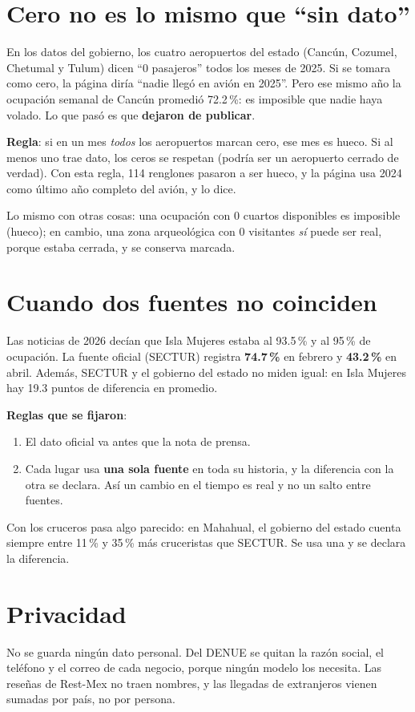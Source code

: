 \section{Cero no es lo mismo que ``sin dato''}
\begin{ejemplo}
En los datos del gobierno, los cuatro aeropuertos del estado (Cancún, Cozumel, Chetumal y Tulum) dicen ``0 pasajeros''
todos los meses de 2025. Si se tomara como cero, la página diría ``nadie llegó en avión en 2025''. Pero ese mismo año la
ocupación semanal de Cancún promedió 72.2\,\%: es imposible que nadie haya volado. Lo que pasó es que \textbf{dejaron de
publicar}.

\textbf{Regla}: si en un mes \emph{todos} los aeropuertos marcan cero, ese mes es hueco. Si al menos uno trae dato, los
ceros se respetan (podría ser un aeropuerto cerrado de verdad). Con esta regla, 114 renglones pasaron a ser hueco, y la
página usa 2024 como último año completo del avión, y lo dice.
\end{ejemplo}

Lo mismo con otras cosas: una ocupación con 0 cuartos disponibles es imposible (hueco); en cambio, una zona arqueológica
con 0 visitantes \emph{sí} puede ser real, porque estaba cerrada, y se conserva marcada.

\section{Cuando dos fuentes no coinciden}
\begin{ejemplo}
Las noticias de 2026 decían que Isla Mujeres estaba al 93.5\,\% y al 95\,\% de ocupación. La fuente oficial (SECTUR)
registra \textbf{74.7\,\%} en febrero y \textbf{43.2\,\%} en abril. Además, SECTUR y el gobierno del estado no miden igual:
en Isla Mujeres hay 19.3 puntos de diferencia en promedio.
\end{ejemplo}
\textbf{Reglas que se fijaron}:
\begin{enumerate}
\item El dato oficial va antes que la nota de prensa.
\item Cada lugar usa \textbf{una sola fuente} en toda su historia, y la diferencia con la otra se declara. Así un cambio
  en el tiempo es real y no un salto entre fuentes.
\end{enumerate}
Con los cruceros pasa algo parecido: en Mahahual, el gobierno del estado cuenta siempre entre 11\,\% y 35\,\% más
cruceristas que SECTUR. Se usa una y se declara la diferencia.

\section{Privacidad}
No se guarda ningún dato personal. Del DENUE se quitan la razón social, el teléfono y el correo de cada negocio, porque
ningún modelo los necesita. Las reseñas de Rest-Mex no traen nombres, y las llegadas de extranjeros vienen sumadas por
país, no por persona.
